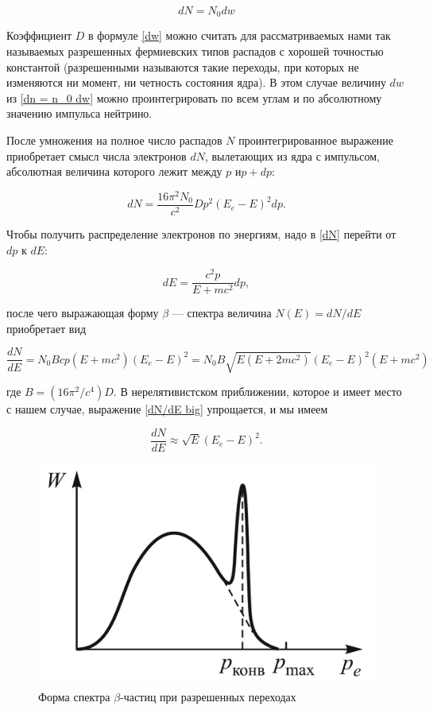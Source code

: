 \documentclass[12pt]{kiarticle}
\newcommand{\be}{\ensuremath{\beta}}
\begin{document}
\begin{equation}\label{dn = n_0 dw}
dN = N_0 dw  
\end{equation}

Коэффициент $ D $ в формуле \eqref{dw} можно считать для рассматриваемых нами так называемых разрешенных фермиевских типов распадов с хорошей точностью константой (разрешенными называются такие переходы, при которых не изменяются ни момент, ни четность состояния ядра). В этом случае величину $ dw $ из \eqref{dn = n_0 dw} можно проинтегрировать по всем углам и по абсолютному значению импульса нейтрино.

После умножения на полное число распадов $ N $ проинтегрированное выражение приобретает смысл числа электронов $ dN $, вылетающих из ядра с импульсом, абсолютная величина которого лежит между $ p $ и$  p + dp $:

\begin{equation}\label{dN}
dN = \dfrac{16\pi^2 N_0}{c^2}Dp^2(E_e - E)^2dp.
\end{equation}

Чтобы получить распределение электронов по энергиям, надо в \eqref{dN} перейти от $ dp $ к $ dE $:

\begin{equation}
dE = \dfrac{c^2p}{E + mc^2}dp,
\end{equation}

после чего выражающая форму $\beta$ --- спектра величина $ N(E) = dN/dE $
приобретает вид

\begin{equation}\label{dN/dE big}
\dfrac{dN}{dE} = N_0Bcp(E + mc^2)(E_e - E)^2 = N_0B\sqrt{E(E + 2mc^2)}(E_e - E)^2(E + mc^2)
\end{equation}

где $B = (16\pi^2/c^4)D$. В нерелятивистском приближении, которое и имеет место с нашем случае, выражение \eqref{dN/dE big} упрощается, и мы имеем

\begin{equation}\label{dN/dE}
\dfrac{dN}{dE} \approx \sqrt{E}(E_e - E)^2.
\end{equation}

\begin{figure}
	\includegraphics[width=\linewidth]{spektr}
	\caption{Форма спектра \be-частиц
		при разрешенных переходах}
	\label{ris spetr}
\end{figure}
\end{document}
